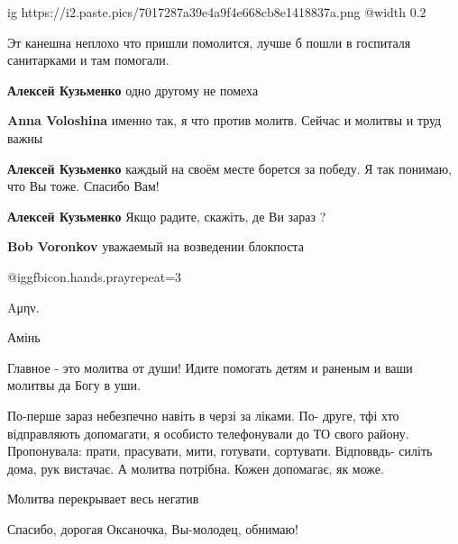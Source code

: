  
 
 
 
 
\zzSecCmt

\begin{itemize} %

\ifcmt
  ig https://i2.paste.pics/7017287a39e4a9f4e668cb8e1418837a.png
  @width 0.2
\fi


Эт канешна неплохо что пришли помолится, лучше б пошли в госпиталя санитарками
и там помогали.

\begin{itemize} %
\textbf{Алексей Кузьменко} одно другому не помеха

\textbf{Anna Voloshina} именно так, я что против молитв. Сейчас и молитвы и труд важны
\end{itemize} %

\textbf{Алексей Кузьменко} каждый на своём месте борется за победу. Я так понимаю, что Вы тоже.
Спасибо Вам!

\textbf{Алексей Кузьменко} Якщо радите, скажіть, де Ви зараз ?

\textbf{Bob Voronkov} уважаемый на возведении блокпоста

 @igg{fbicon.hands.pray}{repeat=3} 

Αμην.

Амінь

Главное - это молитва от души! Идите помогать детям и раненым и ваши молитвы да Богу в уши.


По-перше зараз небезпечно навіть в черзі за ліками. По- друге, тфі хто
відправляють допомагати, я особисто телефонували до ТО свого району.
Пропонувала: прати, прасувати, мити, готувати, сортувати. Відповвдь- силіть
дома, рук вистачає. А молитва потрібна. Кожен допомагає, як може.

Молитва перекрывает весь негатив

Спасибо, дорогая Оксаночка, Вы-молодец, обнимаю!

\end{itemize} %
